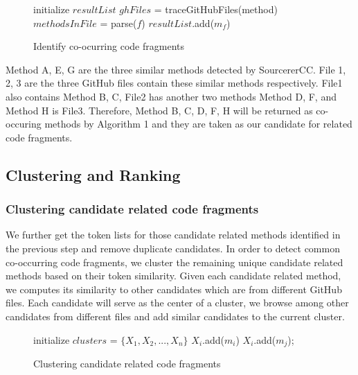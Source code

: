 \begin{figure}[h]
		\label{alg: co-occur}
 \removelatexerror
\begin{algorithm}[H]
	\caption{Identify co-ocurring code fragments}
	initialize $resultList$\;
	{
		$ghFiles$ = traceGitHubFiles(method) \;
		{
			$methodsInFile$ = parse($f$)\;
			{
				{
					$resultList$.add($m_f$) \;
				}
			}
		} 
	}
\end{algorithm}
\end{figure}

{\ttt Method A, E, G} are the three similar methods detected by SourcererCC. {\ttt File 1, 2, 3} are the three GitHub files contain these similar methods respectively. 
{\ttt File1} also contains {\ttt Method B, C}, {\ttt File2} has another two methods {\ttt Method D, F}, and {\ttt Method H} is {\ttt File3}. Therefore, {\ttt Method B, C, D, F, H} will be returned as co-occuring methods by Algorithm 1 and they are taken as our candidate for related code fragments.

\subsection{Clustering and Ranking}
\subsubsection{Clustering candidate related code fragments}
We further get the token lists for those candidate related methods identified in the previous step and remove duplicate candidates. In order to detect common co-occurring code fragments, we cluster the remaining unique candidate related methods
based on their token similarity.  Given each candidate related method, we computes its similarity to other candidates which are from different GitHub files. Each candidate will serve as the center of a cluster, we browse among other candidates from different files and add similar candidates to the current cluster.

\begin{figure}[h]
	\label{alg: Clustering candidate related methods}
	\removelatexerror
	\begin{algorithm}[H]
		\caption{Clustering candidate related code fragments}
		initialize $clusters$ = $\{X_1, X_2,..., X_n\}$\;
		{
			$X_i$.add($m_i$) \;
			{
				{
					{
						$X_i$.add($m_j$);
					}
				}
			} 
		}
	\end{algorithm}
\end{figure}

